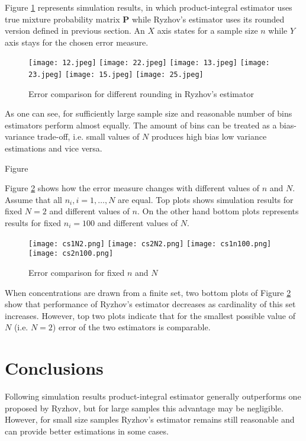 \documentclass[12pt,reqno,a4paper,oneside]{article}
\theoremstyle{plain}
\theoremstyle{definition}
\theoremstyle{remark}
\begin{document}
Figure \ref{fig:1} represents simulation results, in which product-integral estimator uses true mixture probability matrix $\mathbf P$ while Ryzhov's estimator uses its rounded version defined in previous section. An $X$ axis states for a sample size $n$ while $Y$ axis stays for the chosen error measure.

\begin{figure}
	\centering
	\caption{\label{fig:1}Error comparison for different rounding in Ryzhov's estimator}
	\texttt{[image: 12.jpeg]}
	\texttt{[image: 22.jpeg]}
	\texttt{[image: 13.jpeg]}
	\texttt{[image: 23.jpeg]}
	\texttt{[image: 15.jpeg]}
	\texttt{[image: 25.jpeg]}
\end{figure}

As one can see, for sufficiently large sample size and reasonable number of bins estimators perform almost equally. The amount of bins can be treated as a bias-variance trade-off, i.e. small values of $N$ produces high bias low variance estimations and vice versa.

Figure 

Figure \ref{fig:3} shows how the error measure changes  with different values of $n$ and $N$. Assume that all $n_i, i=1,\ldots, N$ are equal. Top plots shows simulation results for fixed $N=2$ and different values of $n$. On the other hand bottom plots represents results for fixed $n_i=100$ and different values of $N$.

\begin{figure}
	\centering
	\caption{\label{fig:3}Error comparison for fixed $n$ and $N$}
	\texttt{[image: cs1N2.png]}
	\texttt{[image: cs2N2.png]}
	\texttt{[image: cs1n100.png]}
	\texttt{[image: cs2n100.png]}
\end{figure}

When concentrations are drawn from a finite set, two bottom plots of Figure \ref{fig:3} show that performance of Ryzhov's estimator decreases as cardinality of this set increases. However, top two plots indicate that for the smallest possible value of $N$ (i.e. $N=2$) error of the two estimators is comparable.


\section{Conclusions}
\label{sec:Conclusions}
Following simulation results product-integral estimator generally outperforms one proposed by Ryzhov, but for large samples this advantage may be negligible. However, for small size samples  Ryzhov's estimator remains still reasonable and can provide better estimations in some cases.
\end{document}
